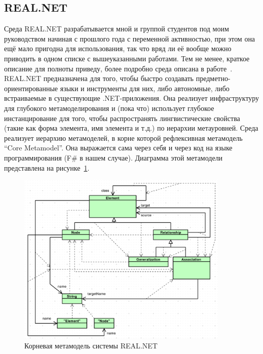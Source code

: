 \documentclass[a5paper]{article}
\begin{document}
\subsection{REAL.NET}

Среда REAL.NET разрабатывается мной и группой студентов под моим руководством начиная с прошлого года с переменной активностью, при этом она ещё мало пригодна для использования, так что вряд ли её вообще можно приводить в одном списке с вышеуказанными работами. Тем не менее, краткое описание для полноты приведу, более подробно среда описана в работе~\cite{litvinov2017realnet}. REAL.NET предназначена для того, чтобы быстро создавать предметно-ориентированные языки и инструменты для них, либо автономные, либо встраиваемые в существующие .NET-приложения. Она реализует инфраструктуру для глубокого метамоделирования и (пока что) использует глубокое инстанцирование для того, чтобы распространять лингвистические свойства (такие как форма элемента, имя элемента и т.д.) по иерархии метауровней. Среда реализует иерархию метамоделей, в корне которой рефлексивная метамодель ``Core Metamodel''. Она выражается сама через себя и через код на языке программирования (F\# в нашем случае). Диаграмма этой метамодели представлена на рисунке~\ref{figure:realNetMetametamodel}.

\begin{figure}
	\begin{center}
		\includegraphics[width=0.9\textwidth]{realNetMetametamodel.png}
	\end{center}
	\caption{Корневая метамодель системы REAL.NET}
	\label{figure:realNetMetametamodel}
\end{figure}
\end{document}
